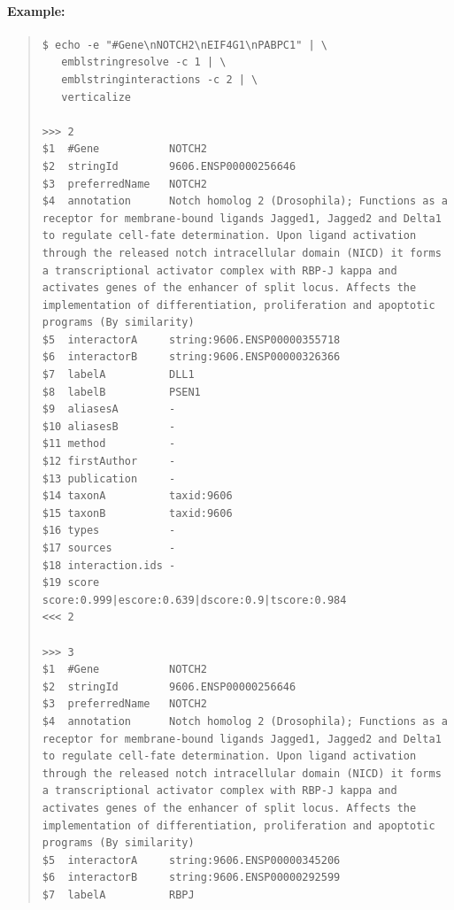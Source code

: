 \documentclass[12pt]{article}
\begin{document}
\paragraph{Example:}
\begin{quote}
\begin{verbatim}
$ echo -e "#Gene\nNOTCH2\nEIF4G1\nPABPC1" | \
   emblstringresolve -c 1 | \
   emblstringinteractions -c 2 | \
   verticalize 
   
>>>	2
$1	#Gene          	NOTCH2
$2	stringId       	9606.ENSP00000256646
$3	preferredName  	NOTCH2
$4	annotation     	Notch homolog 2 (Drosophila); Functions as a receptor for membrane-bound ligands Jagged1, Jagged2 and Delta1 to regulate cell-fate determination. Upon ligand activation through the released notch intracellular domain (NICD) it forms a transcriptional activator complex with RBP-J kappa and activates genes of the enhancer of split locus. Affects the implementation of differentiation, proliferation and apoptotic programs (By similarity)
$5	interactorA    	string:9606.ENSP00000355718
$6	interactorB    	string:9606.ENSP00000326366
$7	labelA         	DLL1
$8	labelB         	PSEN1
$9	aliasesA       	-
$10	aliasesB       	-
$11	method         	-
$12	firstAuthor    	-
$13	publication    	-
$14	taxonA         	taxid:9606
$15	taxonB         	taxid:9606
$16	types          	-
$17	sources        	-
$18	interaction.ids	-
$19	score          	score:0.999|escore:0.639|dscore:0.9|tscore:0.984
<<<	2

>>>	3
$1	#Gene          	NOTCH2
$2	stringId       	9606.ENSP00000256646
$3	preferredName  	NOTCH2
$4	annotation     	Notch homolog 2 (Drosophila); Functions as a receptor for membrane-bound ligands Jagged1, Jagged2 and Delta1 to regulate cell-fate determination. Upon ligand activation through the released notch intracellular domain (NICD) it forms a transcriptional activator complex with RBP-J kappa and activates genes of the enhancer of split locus. Affects the implementation of differentiation, proliferation and apoptotic programs (By similarity)
$5	interactorA    	string:9606.ENSP00000345206
$6	interactorB    	string:9606.ENSP00000292599
$7	labelA         	RBPJ

\end{verbatim}
\end{quote}
\end{document}
